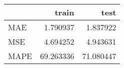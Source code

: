 \begin{tabular}{lrr}
\toprule
{} &      train &       test \\
\midrule
MAE  &   1.790937 &   1.837922 \\
MSE  &   4.694252 &   4.943631 \\
MAPE &  69.263336 &  71.080447 \\
\bottomrule
\end{tabular}
